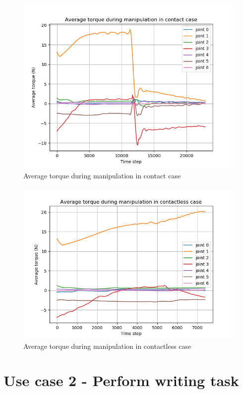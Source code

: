 \documentclass[report.tex]{subfiles}
\begin{document}
    \begin{figure}[H]
        \centering
        \includegraphics[width=\textwidth]{images/us1_con_tor.png}
        \caption{Average torque during manipulation in contact case}
        \label{fig:us1_tor_plot_con}
    \end{figure}
    \begin{figure}[H]
        \centering
        \includegraphics[width=\textwidth]{images/us1_conless_tor.png}
        \caption{Average torque during manipulation in contactless case}
        \label{fig:us1_tor_plot_nocon}
    \end{figure}
    \section{Use case 2 - Perform writing task}
    \label{us2}
\end{document}
